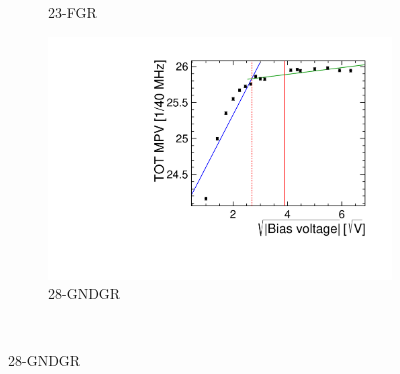 \begin{figure}[htbp]
\begin{subfigure}[b]{0.33\textwidth}
    \caption{23-FGR}
  \end{subfigure}\hfill
  \begin{subfigure}[b]{0.33\textwidth}
    \includegraphics[width=\textwidth]{./figures/TestBeam/depletionVoltage_W0019_L08.pdf}
    \caption{28-GNDGR}
  \end{subfigure} \\


\end{figure}
